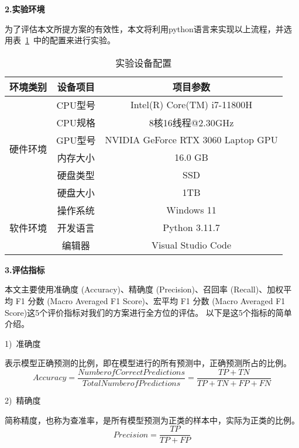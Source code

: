 \textbf{2.实验环境}\par
为了评估本文所提方案的有效性，本文将利用python语言来实现以上流程，并选用表~\ref{tab:env_setting}~中的配置来进行实验。
\begin{table}[htbp]
	\caption{实验设备配置}
	\label{tab:env_setting}
	\centering
	\begin{tabular}{ccc}
		\toprule
		\textbf{环境类别}         & \textbf{设备项目} & \textbf{项目参数}                  \\
		\midrule
		\multirow{6}{*}{硬件环境} & CPU型号           & Intel(R) Core(TM) i7-11800H        \\
		                          & CPU规格           & 8核16线程@2.30GHz                  \\
		                          & GPU型号           & NVIDIA GeForce RTX 3060 Laptop GPU \\
		                          & 内存大小          & 16.0 GB                            \\
		                          & 硬盘类型          & SSD                                \\
		                          & 硬盘大小          & 1TB                                \\
		\hline
		\multirow{3}{*}{软件环境} & 操作系统          & Windows 11                         \\
		                          & 开发语言          & Python 3.11.7                      \\
		                          & 编辑器            & Visual Studio Code                 \\
		\bottomrule
	\end{tabular}
\end{table}

\textbf{3.评估指标}\par
本文主要使用准确度 (Accuracy)、精确度 (Precision)、召回率 (Recall)、加权平均 F1 分数 (Macro Averaged F1 Score)、宏平均 F1 分数 (Macro Averaged F1 Score)这5个评价指标对我们的方案进行全方位的评估。
以下是这5个指标的简单介绍。\par
1)~准确度\par
表示模型正确预测的比例，即在模型进行的所有预测中，正确预测所占的比例。
\begin{equation}
	\label{eq:val_score1}
	Accuracy = \frac{Number of Correct Predictions}{Total Number of Predictions} = \frac{TP + TN}{TP + TN + FP + FN}
\end{equation}

2)~精确度\par
简称精度，也称为查准率，是所有模型预测为正类的样本中，实际为正类的比例。
\begin{equation}
	\label{eq:val_score2}
	Precision = \frac{TP}{TP + FP}
\end{equation}

